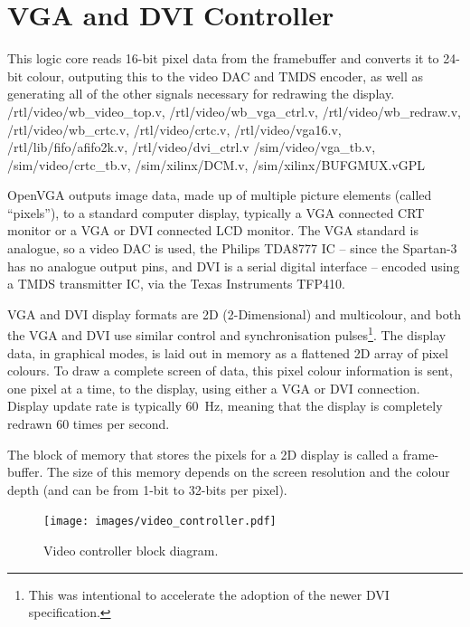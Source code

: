 \section{VGA and DVI Controller}
\label{VIDEO}

{This logic core reads 16-bit pixel data from the framebuffer and converts it to
24-bit colour, outputing this to the video DAC and TMDS encoder, as well as
generating all of the other signals necessary for redrawing the display.}
{/rtl/video/wb\_video\_top.v, /rtl/video/wb\_vga\_ctrl.v,
/rtl/video/wb\_redraw.v, /rtl/video/wb\_crtc.v, /rtl/video/crtc.v,
/rtl/video/vga16.v, /rtl/lib/fifo/afifo2k.v, /rtl/video/dvi\_ctrl.v}
{/sim/video/vga\_tb.v, /sim/video/crtc\_tb.v, /sim/xilinx/DCM.v,
/sim/xilinx/BUFGMUX.v}{GPL}

OpenVGA outputs image data, made up of multiple picture elements (called
``pixels''), to a standard computer display, typically a VGA connected CRT
monitor or a VGA or DVI connected LCD monitor. The VGA standard is analogue, so a
video DAC is used, the Philips TDA8777 IC -- since the Spartan-3 has no analogue
output pins, and DVI is a serial digital interface -- encoded using a TMDS
transmitter IC, via the Texas Instruments TFP410.

VGA and DVI display formats are 2D (2-Dimensional) and multicolour, and both the
VGA and DVI use similar control and synchronisation pulses\footnote{This was
intentional to accelerate the adoption of the newer DVI
specification\cite{VESA_DVI}.}. The display data, in graphical modes, is laid out
in memory as a flattened 2D array of pixel colours. To draw a complete screen of
data, this pixel colour information is sent, one pixel at a time, to the display,
using either a VGA or DVI connection. Display update rate is typically 60~Hz,
meaning that the display is completely redrawn 60 times per second.

The block of memory that stores the pixels for a 2D display is called a
frame-buffer. The size of this memory depends on the screen resolution and the
colour depth (and can be from 1-bit to 32-bits per pixel).

\begin{figure}[h!]
\begin{center}
\texttt{[image: images/video\_controller.pdf]}
\end{center}
\caption[Video controller block diagram]{Video controller block diagram.}
\label{VIDEO_Ctrl}
\end{figure}


